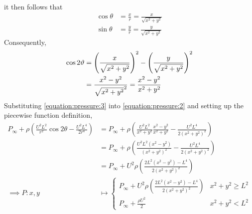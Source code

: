it then follows that
\begin{align*}
    \cos\theta&=\frac{x}{r}=\frac{x}{\sqrt{x^2+y^2}}\\
    \sin\theta&=\frac{y}{r}=\frac{y}{\sqrt{x^2+y^2}}
\end{align*}
Consequently,
\begin{align}
    \notag\cos2\theta&=\left(\frac{x}{\sqrt{x^2+y^2}}\right)^2-\left(\frac{y}{\sqrt{x^2+y^2}}\right)^2\\
    \label{equation:pressure:3}&=\frac{x^2-y^2}{\sqrt{x^2+y^2}^2}=\frac{x^2-y^2}{x^2+y^2}
\end{align}
Substituting \eqref{equation:pressure:3} into \eqref{equation:pressure:2} and setting up the piecewise function definition,
\begin{align*}
    P_\infty+\rho\left(\frac{U^2L^2}{r^2}\cos2\theta-\frac{U^2L^4}{2r^4}\right)&=P_\infty+\rho\left(\frac{U^2L^2}{x^2+y^2}\frac{x^2-y^2}{x^2+y^2}-\frac{U^2L^4}{2\left(x^2+y^2\right)^2}\right)\\
    &=P_\infty+\rho\left(\frac{U^2L^2\left(x^2-y^2\right)}{\left(x^2+y^2\right)^2}-\frac{U^2L^4}{2\left(x^2+y^2\right)^2}\right)\\
    &=P_\infty+U^2\rho\left(\frac{2L^2\left(x^2-y^2\right)-L^4}{2\left(x^2+y^2\right)^2}\right)\\
    \implies P:x,y&\mapsto\left\{\begin{matrix}
        P_\infty+U^2\rho\left(\frac{2L^2\left(x^2-y^2\right)-L^4}{2\left(x^2+y^2\right)^2}\right) & x^2+y^2\geq L^2\\
        P_\infty+\frac{\rho U^2}{2} & x^2+y^2<L^2
    \end{matrix}\right.
\end{align*}